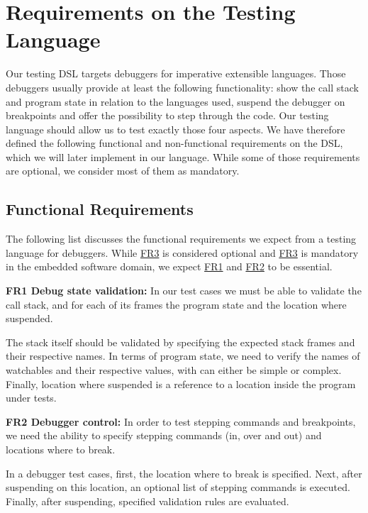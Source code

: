 \section{Requirements on the Testing Language}

Our testing \ac{DSL} targets debuggers for imperative extensible languages.
Those debuggers usually provide at least the following functionality:
show the call stack and program state in relation to the languages used, 
suspend the debugger on breakpoints and offer the possibility to 
step through the code. Our testing language should allow us to test exactly those
four aspects. We have therefore defined the following functional and
non-functional requirements on the \ac{DSL}, which we will later implement in
our language. While some of those requirements are optional, we consider most of
them as mandatory.

\subsection{Functional Requirements}

The following list discusses the functional requirements we expect from a
testing language for debuggers. While \hyperref[FR3]{FR3} is considered
optional and \hyperref[FR3]{FR3} is mandatory in the embedded software domain,
we expect \hyperref[FR1]{FR1} and \hyperref[FR2]{FR2} to be essential.
 
\noindent \textbf{\label{FR1}FR1 Debug state validation:} In our test cases we
must be able to validate the call stack, and for each of its frames 
the program state and the location where suspended. 

The stack itself should be validated by specifying the expected stack frames and
their respective names. In terms of program state, we need to verify the names 
of watchables and their respective values, with can either be simple or complex.
Finally, location where suspended is a reference to a location inside the program under tests. 

\noindent \textbf{\label{FR2}FR2 Debugger control:} In order to test stepping
commands and breakpoints, we need the ability to specify stepping commands
(in, over and out) and locations where to break.

In a debugger test cases,
first, the location where to break is specified. Next, after suspending on this
location, an optional list of stepping commands is executed. Finally, after
suspending, specified validation rules are evaluated.

